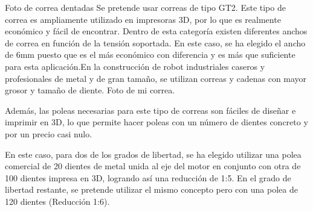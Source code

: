 Foto de correa dentadas
Se pretende usar correas de tipo GT2. Este tipo de correa es ampliamente utilizado en impresoras 3D, por lo que es realmente económico y 
fácil de encontrar. Dentro de esta categoría existen diferentes anchos de correa en función de la tensión soportada. En este caso, 
se ha elegido el ancho de 6mm puesto que es el más económico con diferencia y es más que suficiente para esta aplicación.En la construcción 
de robot industriales caseros y profesionales de metal y de gran tamaño, se utilizan correas y cadenas con mayor grosor y tamaño de diente.
Foto de mi correa.

Además, las poleas necesarias para este tipo de correas son fáciles de diseñar e imprimir en 3D, lo que permite hacer poleas con 
un número de dientes concreto y por un precio casi nulo.

En este caso, para dos de los grados de libertad, se ha elegido utilizar una polea comercial de 20 dientes de metal unida al 
eje del motor en conjunto con otra de 100 dientes impresa en 3D, logrando así una reducción de 1:5. En el grado de libertad restante, 
se pretende utilizar el mismo concepto pero con una polea de 120 dientes (Reducción 1:6).


